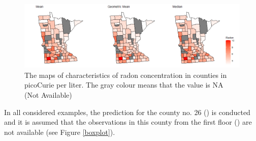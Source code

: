\begin{figure}[h]
\centering
\includegraphics[scale=0.5]{mapaAll.png}
\caption{The maps of characteristics of radon concentration in counties in picoCurie per liter. The gray colour means that the value is NA (Not Available)}\label{map}
\end{figure}
In all considered examples, the prediction for the county no. 26 () is conducted and it is assumed that the observations in this county from the first floor () are not available (see Figure \ref{boxplot}).

